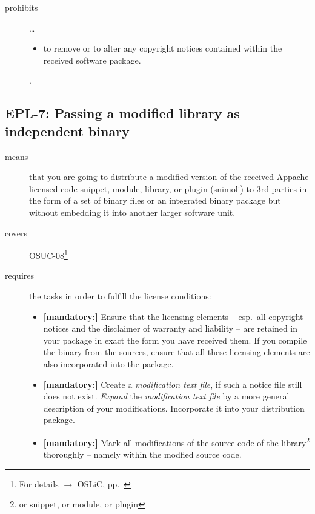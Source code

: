 \begin{description}
\begin{itemize}
\end{itemize}

\item[prohibits] \ldots
\begin{itemize}
  \item to remove or to alter any copyright notices contained within the
  received software package.
\end{itemize}.

\end{description}


\subsection{EPL-7: Passing a modified library as independent binary}

\begin{description}
\item[means] that you are going to distribute a modified version of the received
Appache licensed code snippet, module, library, or plugin (snimoli) to 3rd
parties in the form of a set of binary files or an integrated binary package but
without embedding it into another larger software unit.
\item[covers] OSUC-08\footnote{For details $\rightarrow$ OSLiC, pp.\ \pageref{OSUC-08-DEF}}
\item[requires] the tasks in order to fulfill the license conditions:
\begin{itemize}

  \item \textbf{[mandatory:]} Ensure that the licensing elements -- esp.\ all
  copyright notices and the disclaimer of warranty and liability -- are retained
  in your package in exact the form you have received them. If you compile the
  binary from the sources, ensure that all these licensing elements are also
  incorporated into the package.

  \item \textbf{[mandatory:]} Create a \emph{modification text file}, if such a
  notice file still does not exist. \emph{Expand} the \emph{modification text
  file} by a more general description of your modifications. Incorporate it into
  your distribution package.

  \item \textbf{[mandatory:]} Mark all modifications of the source code of the
  library\footnote{or snippet, or module, or plugin} thoroughly -- namely within
  the modfied source code.


\end{itemize}
\end{description}
